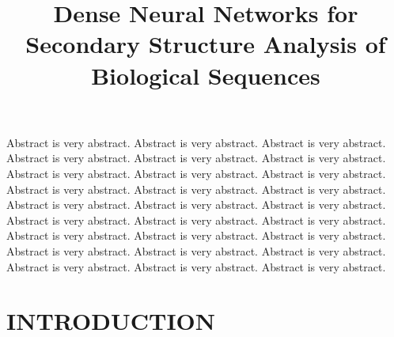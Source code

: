 \documentclass[a4paper,twoside]{article}
\begin{document}
\title{Dense Neural Networks for Secondary Structure Analysis of Biological Sequences}

\author{
}


\abstract
{
Abstract is very abstract. Abstract is very abstract. Abstract is very abstract.
Abstract is very abstract. Abstract is very abstract. Abstract is very abstract.
Abstract is very abstract. Abstract is very abstract. Abstract is very abstract.
Abstract is very abstract. Abstract is very abstract. Abstract is very abstract.
Abstract is very abstract. Abstract is very abstract. Abstract is very abstract.
Abstract is very abstract. Abstract is very abstract. Abstract is very abstract.
Abstract is very abstract. Abstract is very abstract. Abstract is very abstract.
Abstract is very abstract. Abstract is very abstract. Abstract is very abstract.
Abstract is very abstract. Abstract is very abstract. Abstract is very abstract.
}

\onecolumn \maketitle \normalsize \vfill

\section{\uppercase{Introduction}}
\label{sec:introduction}
\end{document}
